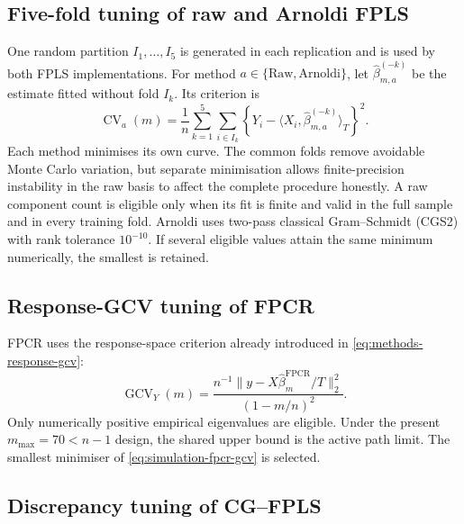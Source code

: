 \subsection{Five-fold tuning of raw and Arnoldi FPLS}

One random partition $I_1,\ldots,I_5$ is generated in each replication and is
used by both FPLS implementations.  For method $a\in\{\mathrm{Raw},
\mathrm{Arnoldi}\}$, let $\widehat\beta_{m,a}^{(-k)}$ be the estimate fitted
without fold $I_k$.  Its criterion is
\begin{equation}
    \operatorname{CV}_{a}(m)
    =\frac1n\sum_{k=1}^{5}\sum_{i\in I_k}
      \left\{Y_i-\langle X_i,
      \widehat\beta_{m,a}^{(-k)}\rangle_T\right\}^{2}.
    \label{eq:simulation-fpls-cv}
\end{equation}
Each method minimises its own curve.  The common folds remove avoidable Monte
Carlo variation, but separate minimisation allows finite-precision instability
in the raw basis to affect the complete procedure honestly.  A raw component
count is eligible only when its fit is finite and valid in the full sample and
in every training fold.  Arnoldi uses two-pass classical Gram--Schmidt (CGS2)
with rank tolerance $10^{-10}$.  If several eligible values attain the same
minimum numerically, the smallest is retained.

\subsection{Response-GCV tuning of FPCR}

FPCR uses the response-space criterion already introduced in
\eqref{eq:methods-response-gcv}:
\begin{equation}
    \operatorname{GCV}_{Y}(m)
    =\frac{n^{-1}\|y-X\widehat\beta_m^{\mathrm{FPCR}}/T\|_2^2}
           {(1-m/n)^2}.
    \label{eq:simulation-fpcr-gcv}
\end{equation}
Only numerically positive empirical eigenvalues are eligible.  Under the
present $m_{\max}=70<n-1$ design, the shared upper bound is the active path
limit.  The smallest minimiser of \eqref{eq:simulation-fpcr-gcv} is selected.

\subsection{Discrepancy tuning of CG--FPLS}

